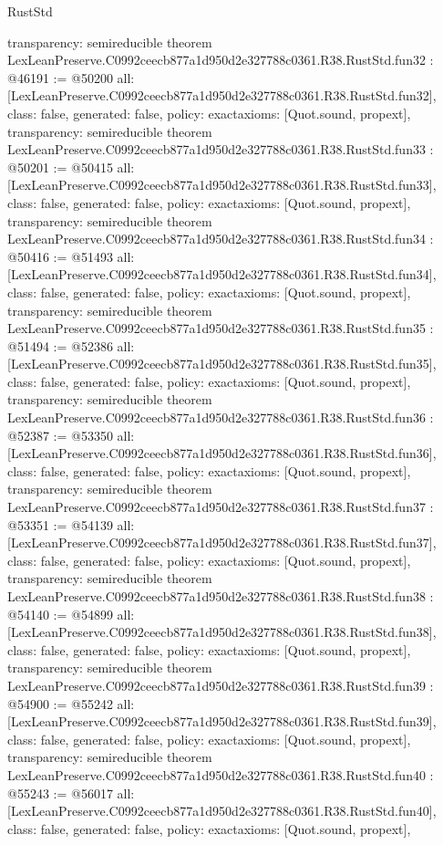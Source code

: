 \begin{lexlean}{RustStd}
\begin{coremodule}
{  transparency: semireducible
}
theorem LexLeanPreserve.C0992ceecb877a1d950d2e327788c0361.R38.RustStd.fun32 : @46191 := @50200 {
  all: [LexLeanPreserve.C0992ceecb877a1d950d2e327788c0361.R38.RustStd.fun32],
  class: false,
  generated: false,
  policy: exact{axioms: [Quot.sound, propext]},
  transparency: semireducible
}
theorem LexLeanPreserve.C0992ceecb877a1d950d2e327788c0361.R38.RustStd.fun33 : @50201 := @50415 {
  all: [LexLeanPreserve.C0992ceecb877a1d950d2e327788c0361.R38.RustStd.fun33],
  class: false,
  generated: false,
  policy: exact{axioms: [Quot.sound, propext]},
  transparency: semireducible
}
theorem LexLeanPreserve.C0992ceecb877a1d950d2e327788c0361.R38.RustStd.fun34 : @50416 := @51493 {
  all: [LexLeanPreserve.C0992ceecb877a1d950d2e327788c0361.R38.RustStd.fun34],
  class: false,
  generated: false,
  policy: exact{axioms: [Quot.sound, propext]},
  transparency: semireducible
}
theorem LexLeanPreserve.C0992ceecb877a1d950d2e327788c0361.R38.RustStd.fun35 : @51494 := @52386 {
  all: [LexLeanPreserve.C0992ceecb877a1d950d2e327788c0361.R38.RustStd.fun35],
  class: false,
  generated: false,
  policy: exact{axioms: [Quot.sound, propext]},
  transparency: semireducible
}
theorem LexLeanPreserve.C0992ceecb877a1d950d2e327788c0361.R38.RustStd.fun36 : @52387 := @53350 {
  all: [LexLeanPreserve.C0992ceecb877a1d950d2e327788c0361.R38.RustStd.fun36],
  class: false,
  generated: false,
  policy: exact{axioms: [Quot.sound, propext]},
  transparency: semireducible
}
theorem LexLeanPreserve.C0992ceecb877a1d950d2e327788c0361.R38.RustStd.fun37 : @53351 := @54139 {
  all: [LexLeanPreserve.C0992ceecb877a1d950d2e327788c0361.R38.RustStd.fun37],
  class: false,
  generated: false,
  policy: exact{axioms: [Quot.sound, propext]},
  transparency: semireducible
}
theorem LexLeanPreserve.C0992ceecb877a1d950d2e327788c0361.R38.RustStd.fun38 : @54140 := @54899 {
  all: [LexLeanPreserve.C0992ceecb877a1d950d2e327788c0361.R38.RustStd.fun38],
  class: false,
  generated: false,
  policy: exact{axioms: [Quot.sound, propext]},
  transparency: semireducible
}
theorem LexLeanPreserve.C0992ceecb877a1d950d2e327788c0361.R38.RustStd.fun39 : @54900 := @55242 {
  all: [LexLeanPreserve.C0992ceecb877a1d950d2e327788c0361.R38.RustStd.fun39],
  class: false,
  generated: false,
  policy: exact{axioms: [Quot.sound, propext]},
  transparency: semireducible
}
theorem LexLeanPreserve.C0992ceecb877a1d950d2e327788c0361.R38.RustStd.fun40 : @55243 := @56017 {
  all: [LexLeanPreserve.C0992ceecb877a1d950d2e327788c0361.R38.RustStd.fun40],
  class: false,
  generated: false,
  policy: exact{axioms: [Quot.sound, propext]},
}
\end{coremodule}
\end{lexlean}
